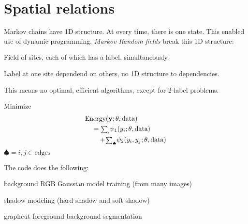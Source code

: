 \section{Spatial relations}
\begin{compactdesc}
\item[\lp{Markov Random Fields}] Markov chains have 1D structure. At every time, there is one state. This enabled use of dynamic programming. \emph{Markov Random fields} break this 1D structure:\\
	\begin{enumerate*}[label=\protect\circled{\arabic*},itemjoin=]
			\item Field of sites, each of which has a label, simultaneously.\\
			\item Label at one site dependend on others, no 1D structure to dependencies. \\
			\item This means no optimal, efficient algorithms, except for 2-label problems.\\
	\end{enumerate*}
	Minimize
	\begin{align*}
		&\text{Energy}(\bm{\mathrm{y}};\theta,\text{data})\\
		&\quad={\scriptstyle\sum_{i}^{}}\psi_1(y_i;\theta,\text{data})\\
		&\qquad+\!{\scriptstyle\sum_{\spadesuit}^{}}\psi_2(y_i,y_j;\theta,\text{data})
	\end{align*}
	$\spadesuit=i,j\in\text{edges}$
\item[\lp{FG-BG segmentation}] The code does the following:\\
	\begin{enumerate*}[label=\protect\circled{\arabic*},itemjoin=]
		\item background RGB Gaussian model training (from many images)\\
		\item shadow modeling (hard shadow and soft shadow)\\
		\item graphcut foreground-background segmentation\\
	\end{enumerate*}
\end{compactdesc}
